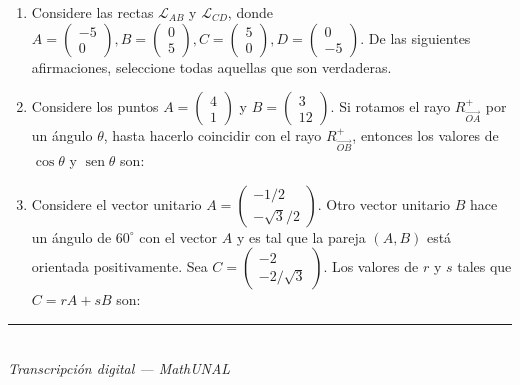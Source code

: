 \documentclass[11pt]{article}
\newcommand{\vect}[2]{\begin{pmatrix}#1\\#2\end{pmatrix}}
\newcommand{\examfooter}{%
  \vfill
  \rule{\linewidth}{0.4pt}\\[1pt]
  {\scriptsize\textit{Transcripción digital --- MathUNAL}\hfill\textcolor{unalblue}{\textbf{\thepage}}}
}
\begin{document}
\begin{enumerate}
\item Considere las rectas $\mathcal{L}_{AB}$ y $\mathcal{L}_{CD}$, donde $A=\vect{-5}{0}, B=\vect{0}{5}, C=\vect{5}{0}, D=\vect{0}{-5}$. De las siguientes afirmaciones, seleccione todas aquellas que son verdaderas.


\item Considere los puntos $A=\vect{4}{1}$ y $B=\vect{3}{12}$. Si rotamos el rayo $R^{+}_{\overrightarrow{OA}}$ por un ángulo $\theta$, hasta hacerlo coincidir con el rayo $R^{+}_{\overrightarrow{OB}}$, entonces los valores de $\cos\theta$ y $\operatorname{sen}\theta$ son:

\item Considere el vector unitario $A=\vect{-1/2}{-\sqrt{3}/2}$. Otro vector unitario $B$ hace un ángulo de $60^\circ$ con el vector $A$ y es tal que la pareja $(A,B)$ está orientada positivamente. Sea $C=\vect{-2}{-2/\sqrt{3}}$. Los valores de $r$ y $s$ tales que $C=rA+sB$ son:

\end{enumerate}

\examfooter
\end{document}
